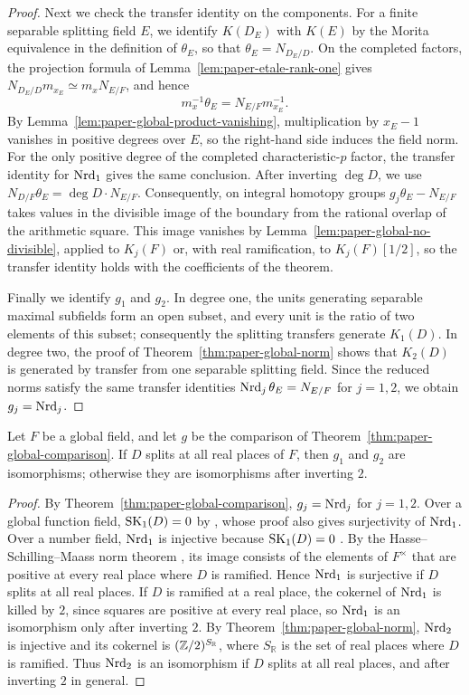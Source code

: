 \begin{proof}
Next we check the transfer identity on the components.
For a finite separable splitting field $E$, we identify $K(D_E)$ with $K(E)$ by the Morita equivalence in the definition of $\theta_E$, so that $\theta_E=N_{D_E/D}$.
On the completed factors, the projection formula of Lemma~\ref{lem:paper-etale-rank-one} gives $N_{D_E/D}m_{x_E}\simeq m_xN_{E/F}$, and hence
\[
 m_x^{-1}\theta_E=N_{E/F}m_{x_E}^{-1}.
\]
By Lemma~\ref{lem:paper-global-product-vanishing}, multiplication by $x_E-1$ vanishes in positive degrees over $E$, so the right-hand side induces the field norm.
For the only positive degree of the completed characteristic-$p$ factor, the transfer identity for $\operatorname{Nrd}_1$ gives the same conclusion.
After inverting $\deg D$, we use $N_{D/F}\theta_E=\deg D\cdot N_{E/F}$.
Consequently, on integral homotopy groups $g_j\theta_E-N_{E/F}$ takes values in the divisible image of the boundary from the rational overlap of the arithmetic square.
This image vanishes by Lemma~\ref{lem:paper-global-no-divisible}, applied to $K_j(F)$ or, with real ramification, to $K_j(F)[1/2]$, so the transfer identity holds with the coefficients of the theorem.

Finally we identify $g_1$ and $g_2$.
In degree one, the units generating separable maximal subfields form an open subset, and every unit is the ratio of two elements of this subset; consequently the splitting transfers generate $K_1(D)$.
In degree two, the proof of Theorem~\ref{thm:paper-global-norm} shows that $K_2(D)$ is generated by transfer from one separable splitting field.
Since the reduced norms satisfy the same transfer identities $\operatorname{Nrd}_j\theta_E=N_{E/F}$ for $j=1,2$, we obtain $g_j=\operatorname{Nrd}_j$.
\end{proof}

\begin{lemma}\label{lem:paper-global-low-degrees}
Let $F$ be a global field, and let $g$ be the comparison of Theorem~\ref{thm:paper-global-comparison}.
If $D$ splits at all real places of $F$, then $g_1$ and $g_2$ are isomorphisms; otherwise they are isomorphisms after inverting $2$.
\end{lemma}
\begin{proof}
By Theorem~\ref{thm:paper-global-comparison}, $g_j=\operatorname{Nrd}_j$ for $j=1,2$.
Over a global function field, $\operatorname{SK}_1(D)=0$ by \cite[Corollary 2]{Yanchevskii1975}, whose proof also gives surjectivity of $\operatorname{Nrd}_1$.
Over a number field, $\operatorname{Nrd}_1$ is injective because $\operatorname{SK}_1(D)=0$ \cite{Wang1950}.
By the Hasse--Schilling--Maass norm theorem \cite[Theorem 33.15]{ReinerMaximalOrders}, its image consists of the elements of $F^\times$ that are positive at every real place where $D$ is ramified.
Hence $\operatorname{Nrd}_1$ is surjective if $D$ splits at all real places.
If $D$ is ramified at a real place, the cokernel of $\operatorname{Nrd}_1$ is killed by $2$, since squares are positive at every real place, so $\operatorname{Nrd}_1$ is an isomorphism only after inverting $2$.
By Theorem~\ref{thm:paper-global-norm}, $\operatorname{Nrd}_2$ is injective and its cokernel is $(\mathbb Z/2)^{S_{\mathbb R}}$, where $S_{\mathbb R}$ is the set of real places where $D$ is ramified.
Thus $\operatorname{Nrd}_2$ is an isomorphism if $D$ splits at all real places, and after inverting $2$ in general.
\end{proof}

